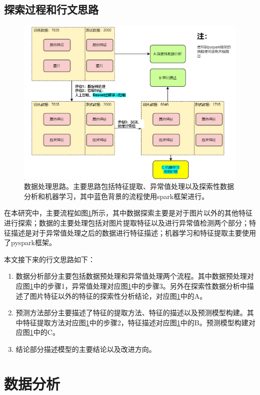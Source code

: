 \documentclass{article}
\begin{document}
\subsection{探索过程和行文思路}
\begin{figure}[tbph!]
	\centering
	\includegraphics[width=0.7\linewidth]{screenshot001}
	\caption{数据处理思路。主要思路包括特征提取、异常值处理以及探索性数据分析和机器学习，其中蓝色背景的流程使用spark框架进行。}
	\label{fig:screenshot001}
\end{figure}
\par 在本研究中，主要流程如图\ref{fig:screenshot001}所示，其中数据探索主要是对于图片以外的其他特征进行探索；数据的主要处理包括对图片提取特征以及进行异常值检测两个部分；特征描述是对于异常值处理之后的数据进行特征描述；机器学习和特征提取主要使用了pyspark框架。
\par 本文接下来的行文思路如下：
\begin{enumerate}
	\item 数据分析部分主要包括数据预处理和异常值处理两个流程。其中数据预处理对应图\ref{fig:screenshot001}中的步骤1，异常值处理对应图\ref{fig:screenshot001}中的步骤3。另外在探索性数据分析中描述了图片特征以外的特征的探索性分析结论，对应图\ref{fig:screenshot001}中的A。
	\item 预测方法部分主要描述了特征的提取方法、特征的描述以及预测模型构建。其中特征提取方法对应图\ref{fig:screenshot001}中的步骤2，特征描述对应图\ref{fig:screenshot001}中的B。预测模型构建对应图\ref{fig:screenshot001}中的C。
	\item 结论部分描述模型的主要结论以及改进方向。
\end{enumerate}
\section{数据分析}\label{数据分析}
\end{document}
